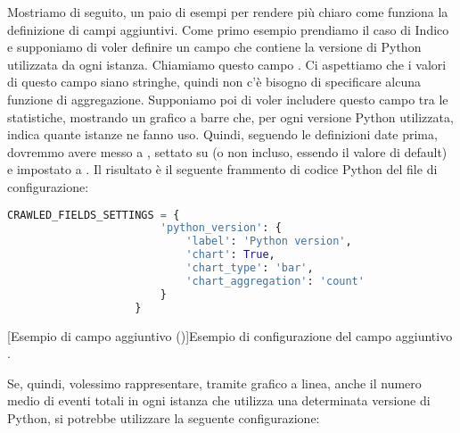             Mostriamo di seguito, un paio di esempi per rendere più chiaro come funziona la definizione di campi aggiuntivi. Come primo esempio prendiamo il caso di Indico e supponiamo di voler definire un campo che contiene la versione di Python utilizzata da ogni istanza. Chiamiamo questo campo . Ci aspettiamo che i valori di questo campo siano stringhe, quindi non c'è bisogno di specificare alcuna funzione di aggregazione. Supponiamo poi di voler includere questo campo tra le statistiche, mostrando un grafico a barre che, per ogni versione Python utilizzata, indica quante istanze ne fanno uso. Quindi, seguendo le definizioni date prima, dovremmo avere  messo a ,  settato su  (o non incluso, essendo  il valore di default) e  impostato a . Il risultato è il seguente frammento di codice Python del file di configurazione:
            
            \begin{center}
                \begin{lstlisting}[language=python, gobble=18]
                    CRAWLED_FIELDS_SETTINGS = {
                        'python_version': {
                            'label': 'Python version',
                            'chart': True,
                            'chart_type': 'bar',
                            'chart_aggregation': 'count'
                        }
                    }
                \end{lstlisting}
                \captionsetup{textformat=empty,labelformat=empty} \vspace{-2em}
                [Esempio di campo aggiuntivo ()]{Esempio di configurazione del campo aggiuntivo .}
            \end{center}
            
            Se, quindi, volessimo rappresentare, tramite grafico a linea, anche il numero medio di eventi totali in ogni istanza che utilizza una determinata versione di Python, si potrebbe utilizzare la seguente configurazione:
            
